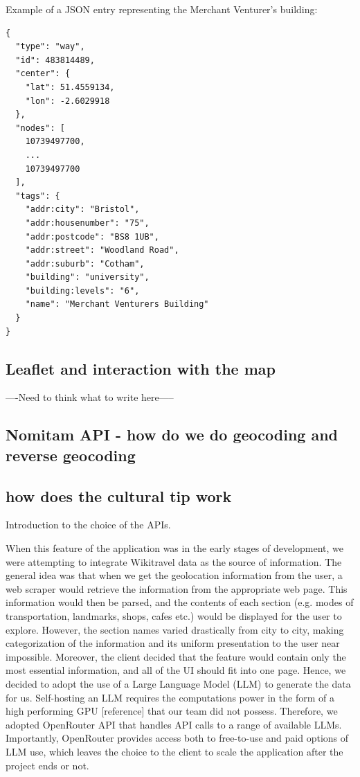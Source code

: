 Example of a JSON entry representing the Merchant Venturer's building:
\begin{verbatim} 
{
  "type": "way",
  "id": 483814489,
  "center": {
    "lat": 51.4559134,
    "lon": -2.6029918
  },
  "nodes": [
    10739497700,
    ...
    10739497700
  ],
  "tags": {
    "addr:city": "Bristol",
    "addr:housenumber": "75",
    "addr:postcode": "BS8 1UB",
    "addr:street": "Woodland Road",
    "addr:suburb": "Cotham",
    "building": "university",
    "building:levels": "6",
    "name": "Merchant Venturers Building"
  }
}
\end{verbatim}

\subsection{Leaflet and interaction with the map}
----Need to think what to write here-----

\subsection{Nomitam API - how do we do geocoding and reverse geocoding}

\subsection{how does the cultural tip work}
Introduction to the choice of the APIs.

When this feature of the application was in the early stages of development, we were attempting to integrate Wikitravel data as the source of information. The general idea was that when we get the geolocation information from the user, a web scraper would retrieve the information from the appropriate web page. This information would then be parsed, and the contents of each section (e.g. modes of transportation, landmarks, shops, cafes etc.) would be displayed for the user to explore. However, the section names varied drastically from city to city, making categorization of the information and its uniform presentation to the user near impossible. Moreover, the client decided that the feature would contain only the most essential information, and all of the UI should fit into one page. Hence, we decided to adopt the use of a Large Language Model (LLM) to generate the data for us.  Self-hosting an LLM requires the computations power in the form of a high performing GPU [reference] that our team did not possess. Therefore, we adopted OpenRouter API that handles API calls to a range of available LLMs. Importantly, OpenRouter provides access both to free-to-use and paid options of LLM use, which leaves the choice to the client to scale the application after the project ends or not.  

